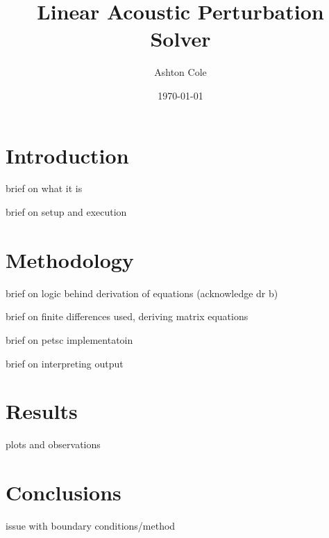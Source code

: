 \documentclass{article}
\title{Linear Acoustic Perturbation Solver}
\author{Ashton Cole}
\date{\today}
\begin{document}
\maketitle

\section{Introduction}

brief on what it is

brief on setup and execution

\section{Methodology}

brief on logic behind derivation of equations (acknowledge dr b)

brief on finite differences used, deriving matrix equations

brief on petsc implementatoin

brief on interpreting output

\section{Results}

plots and observations

\section{Conclusions}

issue with boundary conditions/method
\end{document}
